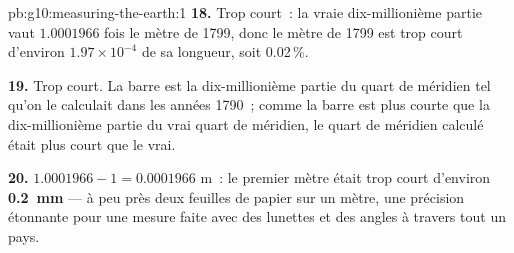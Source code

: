 \begin{solution}{pb:g10:measuring-the-earth:1}
\textbf{18.} Trop court~: la vraie dix-millionième partie vaut $1.0001966$
fois le mètre de 1799, donc le mètre de 1799 est trop court d'environ
$1.97 \times 10^{-4}$ de sa longueur, soit 0.02\,\%.

\textbf{19.} Trop court. La barre est la dix-millionième partie du quart de
méridien tel qu'on le calculait dans les années 1790~; comme la barre est
plus courte que la dix-millionième partie du vrai quart de méridien, le
quart de méridien calculé était plus court que le vrai.

\textbf{20.} $1.0001966 - 1 = 0.0001966$ m~: le premier mètre était trop
court d'environ \textbf{\qty{0.2}{mm}} --- à peu près deux feuilles de
papier sur un mètre, une précision étonnante pour une mesure faite avec des
lunettes et des angles à travers tout un pays.
\end{solution}
